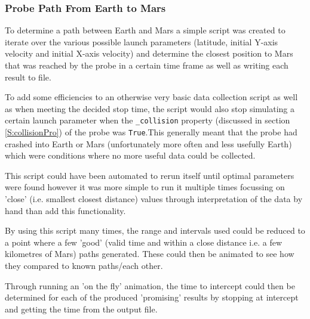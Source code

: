 \documentclass{article}
\begin{document}
            \subsubsection{Probe Path From Earth to Mars}\label{S:PathToMarsMethod}
                To determine a path between Earth and Mars a simple script was created to iterate 
                over the various possible launch parameters (latitude, initial Y-axis velocity and 
                initial X-axis velocity) and determine the closest position to Mars that was reached by
                the probe in a certain time frame as well as writing each result to file.
                \par
                To add some efficiencies to an otherwise very basic data collection script as well 
                as when meeting the decided stop time, the script would also stop simulating a 
                certain launch parameter when the \verb|_collision| property (discussed in section 
                \ref{S:collisionPro}) of the probe was \verb|True|.This generally
                meant that the probe had crashed into Earth or Mars (unfortunately more often and 
                less usefully Earth) which were conditions where no more useful data could 
                be collected.
                \par 
                This script could have been automated to rerun itself until optimal parameters were 
                found however it was more simple to run it multiple times focussing on 'close' 
                (i.e. smallest closest distance) values through interpretation of the data by hand
                than add this functionality. 
                \par
                By using this script many times, the range and intervals used could be reduced to a 
                point where a few 'good' (valid time and within a close distance i.e. a few 
                kilometres of Mars) paths generated. These could then be animated to see how they
                compared to known paths/each other. 
                \par 

                Through running an 'on the fly' animation, the time to intercept could then be 
                determined for each of the produced 'promising' results by stopping at intercept and
                getting the time from the output file.
    \pagebreak
\end{document}
